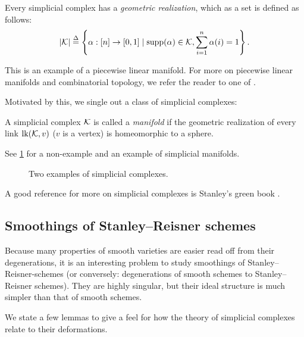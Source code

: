Every simplicial complex has a \emph{geometric realization}, which as a set is defined as follows:
$$
|\mathcal{K}| \stackrel{\Delta}{=} \left\{ \alpha: [n] \to [0,1] \mid \operatorname{{supp}}(\alpha) \in \mathcal{K}, \sum_{i=1}^n \alpha(i) = 1 \right\}.
$$

This is an example of a piecewise linear manifold. For more on piecewise linear manifolds and combinatorial topology, we refer the reader to one of \cite{glaser_combtop,spanier_topology,hudson_pl}.

Motivated by this, we single out a class of simplicial complexes:

\begin{definition}
A simplicial complex $\mathcal{K}$ is called a \emph{manifold} if the geometric realization of every link $\mathrm{lk}(\mathcal{K},v)$ ($v$ is a vertex) is homeomorphic to a sphere.
\end{definition}

See \cref{fig:simpmanifold} for a non-example and an example of simplicial manifolds.

\begin{figure}[t]
\centering 
\hspace*{\fill}%
 \hspace*{\fill}%
 \hspace*{\fill}%
\caption{Two examples of simplicial complexes.}
\label{fig:simpmanifold}
\end{figure}

A good reference for more on simplicial complexes is Stanley's green book \cite{stanley_green}.

\subsection{Smoothings of Stanley--Reisner schemes}

Because many properties of smooth varieties are easier read off from their degenerations, it is an interesting problem to study smoothings of Stanley--Reisner-schemes (or conversely: degenerations of smooth schemes to Stanley--Reisner schemes). They are highly singular, but their ideal structure is much simpler than that of smooth schemes.

We state a few lemmas to give a feel for how the theory of simplicial complexes relate to their deformations.


